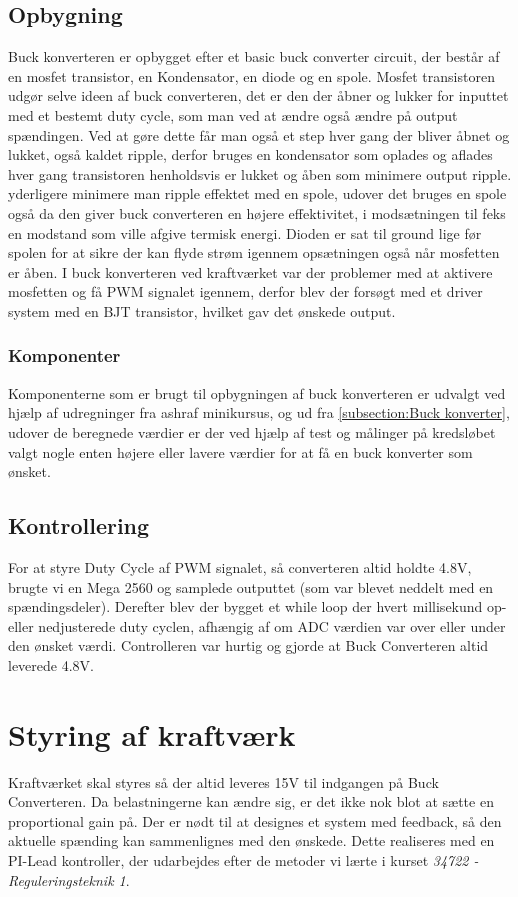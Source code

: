 \documentclass[../main.tex]{subfiles}
\begin{document}
\subsection{Opbygning}
Buck konverteren er opbygget efter et basic buck converter circuit, der består af en mosfet transistor, en Kondensator, en diode og en spole. Mosfet transistoren udgør selve ideen af buck converteren, det er den der åbner og lukker for inputtet med et bestemt duty cycle, som man ved at ændre også ændre på output spændingen. Ved at gøre dette får man også et step hver gang der bliver åbnet og lukket, også kaldet ripple, derfor bruges en kondensator som oplades og aflades hver gang transistoren henholdsvis er lukket og åben som minimere output ripple. yderligere minimere man ripple effektet med en spole, udover det bruges en spole også da den giver buck converteren en højere effektivitet, i modsætningen til feks en modstand som ville afgive termisk energi. Dioden er sat til ground lige før spolen for at sikre der kan flyde strøm igennem opsætningen også når mosfetten er åben. 
I buck konverteren ved kraftværket var der problemer med at aktivere mosfetten og få PWM signalet igennem, derfor blev der forsøgt med et driver system med en BJT transistor, hvilket gav det ønskede output. 

\subsubsection{Komponenter}
Komponenterne som er brugt til opbygningen af buck konverteren er udvalgt ved hjælp af udregninger fra ashraf minikursus, og ud fra \ref{subsection:Buck konverter}, udover de beregnede værdier er der ved hjælp af test og målinger på kredsløbet valgt nogle enten højere eller lavere værdier for at få en buck konverter som ønsket.


\subsection{Kontrollering}
For at styre Duty Cycle af PWM signalet, så converteren altid holdte 4.8V, brugte vi en Mega 2560 og samplede outputtet (som var blevet neddelt med en spændingsdeler). Derefter blev der bygget et while loop der hvert millisekund op- eller nedjusterede duty cyclen, afhængig af om ADC værdien var over eller under den ønsket værdi. Controlleren var hurtig og gjorde at Buck Converteren altid leverede 4.8V. 

\section{Styring af kraftværk}
Kraftværket skal styres så der altid leveres 15V til indgangen på Buck Converteren. Da belastningerne kan ændre sig, er det ikke nok blot at sætte en proportional gain på. Der er nødt til at designes et system med feedback, så den aktuelle spænding kan sammenlignes med den ønskede. Dette realiseres med en PI-Lead kontroller, der udarbejdes efter de metoder vi lærte i kurset \emph{34722 - Reguleringsteknik 1}.
\end{document}
